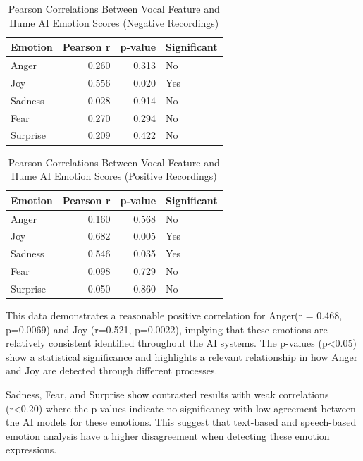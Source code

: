 \begin{table}[H]
    \centering
    \caption{Pearson Correlations Between Vocal Feature and Hume AI Emotion Scores (Negative Recordings)}
    \label{tab:corr_neg}
    \begin{tabular}{lrrl}
      \toprule
      \textbf{Emotion} & \textbf{Pearson r} & \textbf{p-value} & \textbf{Significant}\\
      \midrule
      Anger    & 0.260 & 0.313 & No  \\
      Joy      & 0.556 & 0.020 & Yes \\
      Sadness  & 0.028 & 0.914 & No  \\
      Fear     & 0.270 & 0.294 & No  \\
      Surprise & 0.209 & 0.422 & No  \\
      \bottomrule
    \end{tabular}
  \end{table}
  

  \begin{table}[H]
    \centering
    \caption{Pearson Correlations Between Vocal Feature and Hume AI Emotion Scores (Positive Recordings)}
    \label{tab:corr_pos}
    \begin{tabular}{lrrl}
      \toprule
      \textbf{Emotion} & \textbf{Pearson r} & \textbf{p-value} & \textbf{Significant}\\
      \midrule
      Anger    & 0.160  & 0.568 & No  \\
      Joy      & 0.682  & 0.005 & Yes \\
      Sadness  & 0.546  & 0.035 & Yes \\
      Fear     & 0.098  & 0.729 & No  \\
      Surprise & -0.050 & 0.860 & No  \\
      \bottomrule
    \end{tabular}
  \end{table}

This data demonstrates a reasonable positive correlation for Anger(r = 0.468, p=0.0069) and Joy (r=0.521, p=0.0022), implying that these emotions are relatively consistent identified throughout the AI systems. 
The p-values (p<0.05) show a statistical significance and highlights a relevant relationship in how Anger and Joy are detected through different processes. 

Sadness, Fear, and Surprise show contrasted results with weak correlations (r<0.20) where the p-values indicate no significancy with low agreement between the AI models for these emotions. 
This suggest that text-based and speech-based emotion analysis have a higher disagreement when detecting these emotion expressions. 

